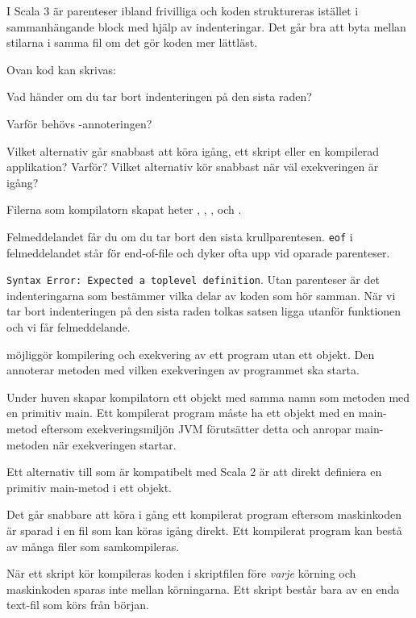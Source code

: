\Subtask I Scala 3 är parenteser ibland frivilliga och koden struktureras istället i sammanhängande block med hjälp av indenteringar. Det går bra att byta mellan stilarna i samma fil om det gör koden mer lättläst.

Ovan kod kan skrivas:

Vad händer om du tar bort indenteringen på den sista raden?

\Subtask Varför behövs -annoteringen?

\Subtask Vilket alternativ går snabbast att köra igång, ett skript eller en kompilerad applikation? Varför? Vilket alternativ kör snabbast när väl exekveringen är igång?


\SOLUTION


\TaskSolved \what


\SubtaskSolved  Filerna som kompilatorn skapat heter , , ,  och .

\SubtaskSolved  Felmeddelandet får du om du tar bort den sista krullparentesen. \texttt{eof} i felmeddelandet står för end-of-file och dyker ofta upp vid oparade parenteser.

\SubtaskSolved  \texttt{Syntax Error: Expected a toplevel definition}. Utan parenteser är det indenteringarna som bestämmer vilka delar av koden som hör samman. När vi tar bort indenteringen på den sista raden tolkas satsen ligga utanför funktionen och vi får felmeddelande.

\SubtaskSolved {} möjliggör kompilering och exekvering av ett program utan ett objekt. Den annoterar metoden med vilken exekveringen av programmet ska starta.

Under huven skapar kompilatorn ett objekt med samma namn som metoden med
en primitiv main. Ett kompilerat program måste ha ett objekt med en main-metod
eftersom exekveringsmiljön JVM förutsätter detta och anropar main-metoden när
exekveringen startar.

Ett alternativ till  som är kompatibelt med Scala 2 är att direkt definiera en primitiv main-metod i ett objekt.

\SubtaskSolved
  Det går snabbare att köra i gång ett kompilerat program eftersom maskinkoden är sparad i en fil som kan köras igång direkt.  Ett kompilerat program kan bestå av många filer som samkompileras.

  När ett skript kör kompileras koden i skriptfilen före \emph{varje} körning och maskinkoden sparas inte mellan körningarna. Ett skript består bara av en enda text-fil som körs från början.


